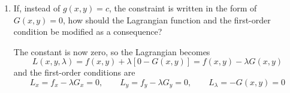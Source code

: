 \begin{enumerate}
\item[4.] If, instead of $g(x, y) = c$, the constraint is written in the form of $G(x, y) = 0$, how should the Lagrangian function and the first-order condition be modified as a consequence?

The constant is now zero, so the Lagrangian becomes
\[L(x, y, \lambda) = f(x, y) + \lambda[0 - G(x, y)] = f(x, y) - \lambda G(x, y)\]
and the first-order conditions are
\[L_x = f_x - \lambda G_x = 0, \qquad L_y = f_y - \lambda G_y = 0, \qquad L_\lambda = -G(x, y) = 0\]

\end{enumerate}
